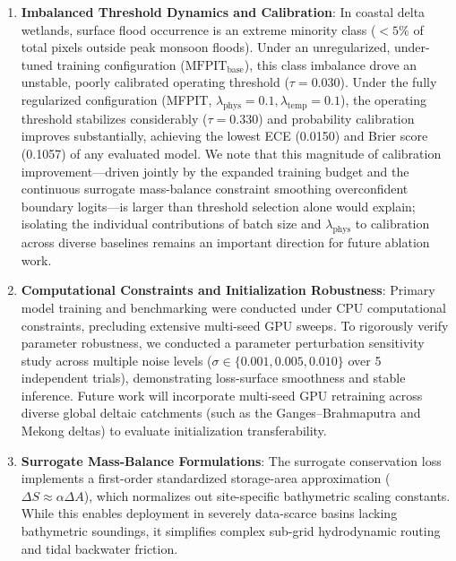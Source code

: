\documentclass[journal]{IEEEtran}
\begin{document}
\begin{enumerate}
    \item \textbf{Imbalanced Threshold Dynamics and Calibration}: In coastal delta wetlands, surface flood occurrence is an extreme minority class ($<5\%$ of total pixels outside peak monsoon floods). Under an unregularized, under-tuned training configuration ($\text{MFPIT}_{\text{base}}$), this class imbalance drove an unstable, poorly calibrated operating threshold ($\tau = 0.030$). Under the fully regularized configuration (MFPIT, $\lambda_{\text{phys}} = 0.1, \lambda_{\text{temp}} = 0.1$), the operating threshold stabilizes considerably ($\tau = 0.330$) and probability calibration improves substantially, achieving the lowest ECE (0.0150) and Brier score (0.1057) of any evaluated model. We note that this magnitude of calibration improvement---driven jointly by the expanded training budget and the continuous surrogate mass-balance constraint smoothing overconfident boundary logits---is larger than threshold selection alone would explain; isolating the individual contributions of batch size and $\lambda_{\text{phys}}$ to calibration across diverse baselines remains an important direction for future ablation work.
    \item \textbf{Computational Constraints and Initialization Robustness}: Primary model training and benchmarking were conducted under CPU computational constraints, precluding extensive multi-seed GPU sweeps. To rigorously verify parameter robustness, we conducted a parameter perturbation sensitivity study across multiple noise levels ($\sigma \in \{0.001, 0.005, 0.010\}$ over 5 independent trials), demonstrating loss-surface smoothness and stable inference. Future work will incorporate multi-seed GPU retraining across diverse global deltaic catchments (such as the Ganges--Brahmaputra and Mekong deltas) to evaluate initialization transferability.
    \item \textbf{Surrogate Mass-Balance Formulations}: The surrogate conservation loss implements a first-order standardized storage-area approximation ($\Delta S \approx \alpha \Delta A$), which normalizes out site-specific bathymetric scaling constants. While this enables deployment in severely data-scarce basins lacking bathymetric soundings, it simplifies complex sub-grid hydrodynamic routing and tidal backwater friction.
\end{enumerate}
\end{document}
